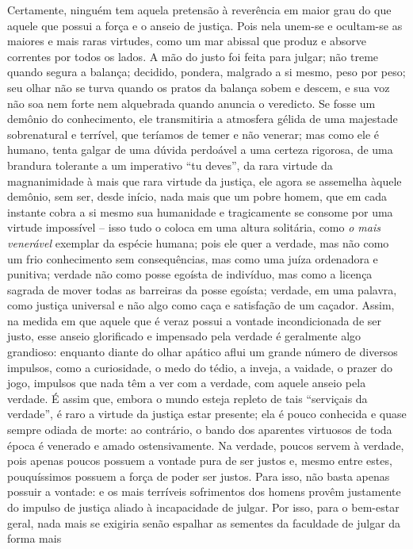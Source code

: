 Certamente, ninguém tem aquela pretensão à reverência em maior grau do
que aquele que possui a força e o anseio de justiça. Pois nela unem-se e
ocultam-se as maiores e mais raras virtudes, como um mar abissal que
produz e absorve correntes por todos os lados. A mão do justo foi feita
para julgar; não treme quando segura a balança; decidido, pondera,
malgrado a si mesmo, peso por peso; seu olhar não se turva quando os
pratos da balança sobem e descem, e sua voz não soa nem forte nem
alquebrada quando anuncia o veredicto. Se fosse um demônio do
conhecimento, ele transmitiria a atmosfera gélida de uma majestade
sobrenatural e terrível, que teríamos de temer e não venerar; mas como
ele é humano, tenta galgar de uma dúvida perdoável a uma certeza
rigorosa, de uma brandura tolerante a um imperativo ``tu deves'', da
rara virtude da magnanimidade à mais que rara virtude da justiça, ele
agora se assemelha àquele demônio, sem ser, desde início, nada mais que
um pobre homem, que em cada instante cobra a si mesmo sua humanidade e
tragicamente se consome por uma virtude impossível -- isso tudo o coloca
em uma altura solitária, como \emph{o mais venerável} exemplar da
espécie humana; pois ele quer a verdade, mas não como um frio
conhecimento sem consequências, mas como uma juíza ordenadora e
punitiva; verdade não como posse egoísta de indivíduo, mas como a
licença sagrada de mover todas as barreiras da posse egoísta; verdade,
em uma palavra, como justiça universal e não algo como caça e satisfação
de um caçador. Assim, na medida em que aquele que é veraz possui a
vontade incondicionada de ser justo, esse anseio glorificado e impensado
pela verdade é geralmente algo grandioso: enquanto diante do olhar
apático aflui um grande número de diversos impulsos, como a curiosidade,
o medo do tédio, a inveja, a vaidade, o prazer do jogo, impulsos que
nada têm a ver com a verdade, com aquele anseio pela verdade. É assim
que, embora o mundo esteja repleto de tais ``serviçais da verdade'', é
raro a virtude da justiça estar presente; ela é pouco conhecida e quase
sempre odiada de morte: ao contrário, o bando dos aparentes virtuosos de
toda época é venerado e amado ostensivamente. Na verdade, poucos servem
à verdade, pois apenas poucos possuem a vontade pura de ser justos e,
mesmo entre estes, pouquíssimos possuem a força de poder ser justos.
Para isso, não basta apenas possuir a vontade: e os mais terríveis
sofrimentos dos homens provêm justamente do impulso de justiça aliado à
incapacidade de julgar. Por isso, para o bem-estar geral, nada mais se
exigiria senão espalhar as sementes da faculdade de julgar da forma mais
